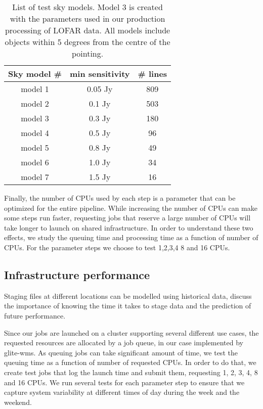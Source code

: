 \begin{table}[h!]
\centering
\begin{tabular}{||c| c c||} 
 \hline
 Sky model \# & min sensitivity & \# lines  \\ [0.5ex] 
 \hline
 model 1 & 0.05 Jy & 809    \\ 
 model 2 & 0.1 Jy & 503   \\
  \hline
 model 3 & 0.3 Jy & 180   \\
  \hline
 model 4 & 0.5 Jy & 96  \\
 model 5 & 0.8 Jy & 49   \\ 
 model 6 & 1.0 Jy & 34   \\
 model 7 & 1.5 Jy & 16   \\[1ex] 
 \hline
\end{tabular}
\caption{List of test sky models. Model 3 is created with the parameters used in our production processing of LOFAR data. All models include objects within 5 degrees from the centre of the pointing.  }
\label{table:skymodels}
\end{table}

Finally, the number of CPUs used by each step is a parameter that can be optimized for the entire pipeline. While increasing the number of CPUs can make some steps run faster, requesting jobs that reserve a large number of CPUs will take longer to launch on shared infrastructure. In order to understand these two effects, we study the queuing time and processing time as a function of number of CPUs. For the parameter steps we choose to test 1,2,3,4 8 and 16 CPUs. 

\subsection{Infrastructure performance}
Staging files at different locations can be modelled using historical data, discuss the importance of knowing the time it takes to stage data and the prediction of future performance. 

Since our jobs are launched on a cluster supporting several different use cases, the requested resources are allocated by a job queue, in our case implemented by glite-wms. As queuing jobs can take significant amount of time, we test the queuing time as a function of number of requested CPUs. In order to do that, we create test jobs that log the launch time and submit them, requesting 1, 2, 3, 4, 8 and 16 CPUs. We run several tests for each parameter step to ensure that we capture system variability at different times of day during the week and the weekend. 

